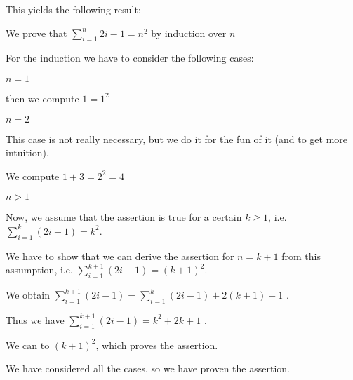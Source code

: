 This yields the following result: 

\begin{mdframed}
  \begin{sproof}[id=simple-proof]
  {We prove that $\sum_{i=1}^n{2i-1}=n^{2}$ by induction over $n$}
  \begin{spfcases}{For the induction we have to consider the following cases:}
    \begin{spfcase}{$n=1$}
      \begin{spfstep}[type=inline] then we compute $1=1^2$\end{spfstep}
    \end{spfcase}
    \begin{spfcase}{$n=2$}
      \begin{spfcomment}[type=inline]
         This case is not really necessary, but we do it for the fun
         of it (and to get more intuition).
      \end{spfcomment}
      \begin{spfstep}[type=inline]
         We compute $1+3=2^{2}=4$
      \end{spfstep}
    \end{spfcase}
    \begin{spfcase}{$n>1$}
      \begin{spfstep}[type=hypothesis,id=ind-hyp]
        Now, we assume that the assertion is true for a certain $k\geq 1$, i.e.
        $\sum_{i=1}^k{(2i-1)}=k^{2}$.
      \end{spfstep}
      \begin{spfcomment}
        We have to show that we can derive the assertion for $n=k+1$ from this
        assumption, i.e.  $\sum_{i=1}^{k+1}{(2i-1)}=(k+1)^{2}$.
      \end{spfcomment}
      \begin{spfstep}[id=splitit]
        We obtain $\sum_{i=1}^{k+1}{(2i-1)}=\sum_{i=1}^k{(2i-1)}+2(k+1)-1$
       .
     \end{spfstep}
     \begin{spfstep}[id=byindhyp]
       Thus we have $\sum_{i=1}^{k+1}{(2i-1)}=k^2+2k+1$
       .
     \end{spfstep}
     \begin{spfstep}[type=conclusion]
       We can  to
       $(k+1)^2$, which proves the assertion.
     \end{spfstep}
   \end{spfcase}
   \begin{spfstep}[type=conclusion]
     We have considered all the cases, so we have proven the assertion.
   \end{spfstep}
  \end{spfcases}
\end{sproof}
\end{mdframed}

